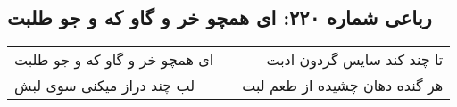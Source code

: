 \begin{center}
\section*{رباعی شماره ۲۲۰: ای همچو خر و گاو که و جو طلبت}
\label{sec:0220}
\begin{longtable}{l p{0.5cm} r}
ای همچو خر و گاو که و جو طلبت
&&
تا چند کند سایس گردون ادبت
\\
لب چند دراز میکنی سوی لبش
&&
هر گنده دهان چشیده از طعم لبت
\\
\end{longtable}
\end{center}
